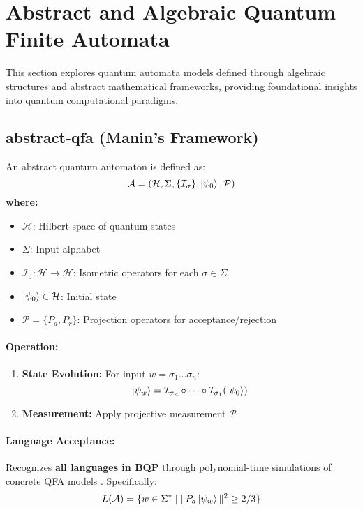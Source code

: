 \section{Abstract and Algebraic Quantum Finite Automata}
\label{sec:abstract-qfa}

This section explores quantum automata models defined through algebraic structures and abstract mathematical frameworks, providing foundational insights into quantum computational paradigms.

\subsection{\acrfull{abstract-qfa} (Manin's Framework)}
\label{subsec:abstract-qfa}

\begin{definition}
An abstract quantum automaton is defined as:
\[
\mathcal{A} = (\mathcal{H}, \Sigma, \{\mathcal{I}_\sigma\}, \ket{\psi_0}, \mathcal{P})
\]
\textbf{where:}
\begin{itemize}
    \item $\mathcal{H}$: Hilbert space of quantum states
    \item $\Sigma$: Input alphabet
    \item $\mathcal{I}_\sigma: \mathcal{H} \rightarrow \mathcal{H}$: Isometric operators for each $\sigma \in \Sigma$
    \item $\ket{\psi_0} \in \mathcal{H}$: Initial state
    \item $\mathcal{P} = \{P_a, P_r\}$: Projection operators for acceptance/rejection
\end{itemize}
\end{definition}

\paragraph{Operation:}
\begin{enumerate}
    \item \textbf{State Evolution:} For input $w = \sigma_1...\sigma_n$:
    \[
    \ket{\psi_w} = \mathcal{I}_{\sigma_n} \circ \cdots \circ \mathcal{I}_{\sigma_1} (\ket{\psi_0})
    \]
    \item \textbf{Measurement:} Apply projective measurement $\mathcal{P}$
\end{enumerate}

\paragraph{Language Acceptance:}
Recognizes \textbf{all languages in BQP} through polynomial-time simulations of concrete QFA models \cite{manin1980computable, gruska2005}. Specifically:
\[
L(\mathcal{A}) = \{w \in \Sigma^* \mid \|P_a\ket{\psi_w}\|^2 \geq 2/3\}
\]

